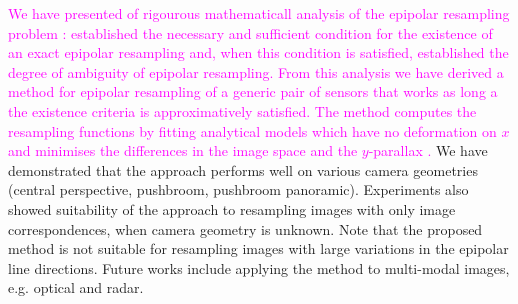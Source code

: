 \documentclass{ipol}
\newcommand{\mpd}[1]{\textcolor{magenta}{#1}}
\begin{document}
\mpd{We have presented of rigourous mathematicall analysis of the epipolar resampling problem :  established the necessary and sufficient condition for the existence of an exact epipolar resampling and, when this condition is satisfied, established the degree of ambiguity of epipolar resampling. From this analysis we have derived a method for epipolar resampling of a generic pair of sensors that works as long a the existence criteria is approximatively satisfied. The method computes the resampling functions by fitting  analytical models which have no deformation on $x$  and minimises the differences in  the image space and the $y$-parallax .} We have demonstrated that the approach performs well on various camera geometries (central perspective, pushbroom, pushbroom panoramic). Experiments also showed suitability of the approach to resampling images with only image correspondences, when camera geometry is unknown. Note that the proposed method is not suitable for resampling images with large variations in the epipolar line directions. Future works include applying the method to multi-modal images, e.g. optical and radar.
%
%
%
\end{document}
